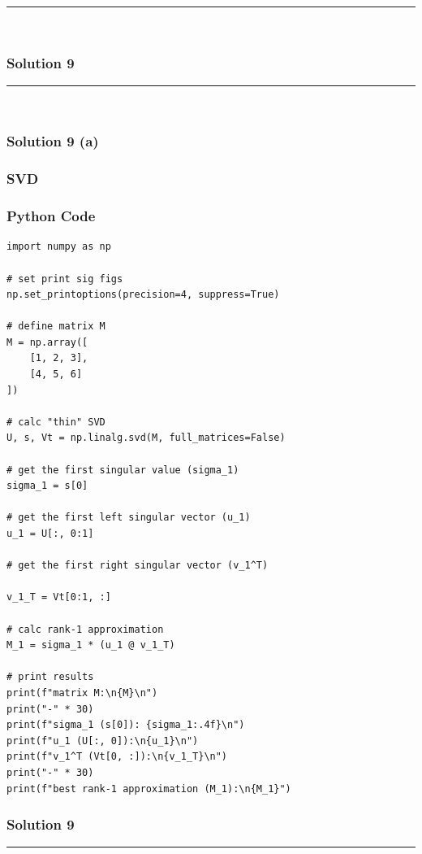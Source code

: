 \documentclass{article}
\begin{document}
{\noindent\rule{\textwidth}{0.4pt}\\

\newpage

\subsubsection*{Solution 9}
\noindent\rule{\textwidth}{0.4pt}\\
\subsubsection*{Solution 9 (a)}
\subsubsection*{SVD}

\subsubsection*{Python Code}
\begin{lstlisting}
import numpy as np

# set print sig figs
np.set_printoptions(precision=4, suppress=True)

# define matrix M
M = np.array([
    [1, 2, 3],
    [4, 5, 6]
])

# calc "thin" SVD
U, s, Vt = np.linalg.svd(M, full_matrices=False)

# get the first singular value (sigma_1)
sigma_1 = s[0]

# get the first left singular vector (u_1)
u_1 = U[:, 0:1]  

# get the first right singular vector (v_1^T)

v_1_T = Vt[0:1, :] 

# calc rank-1 approximation
M_1 = sigma_1 * (u_1 @ v_1_T)

# print results
print(f"matrix M:\n{M}\n")
print("-" * 30)
print(f"sigma_1 (s[0]): {sigma_1:.4f}\n")
print(f"u_1 (U[:, 0]):\n{u_1}\n")
print(f"v_1^T (Vt[0, :]):\n{v_1_T}\n")
print("-" * 30)
print(f"best rank-1 approximation (M_1):\n{M_1}")
\end{lstlisting}

\newpage

\subsubsection*{Solution 9}
\noindent\rule{\textwidth}{0.4pt}\\
}
\end{document}
